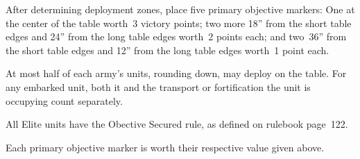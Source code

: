 
\teaser{}

\begin{tablesetup}
  \dawnofwar

  \bigskip%
  After determining deployment zones, place five primary objective
  markers: One at the center of the table worth~3 victory points; two
  more 18'' from the short table edges and 24'' from the long table
  edges worth~2 points each; and two~36'' from the short table edges
  and 12'' from the long table edges worth~1 point each.

\end{tablesetup}

\begin{missionrules}

   At most half of each army's
  units, rounding down, may deploy on the table.  For any embarked
  unit, both it and the transport or fortification the unit is
  occupying count separately.

    All Elite units have
  the Obective Secured rule, as defined on rulebook page~122.
\end{missionrules}


\begin{scoring}
  
\begin{primaries}

  Each primary objective marker is worth their respective value given
  above.

\end{primaries}

\begin{secondaries}
  \seizeground

  \breaktheirback

  \meatgrinder

  \assassination
\end{secondaries}

\end{scoring}
